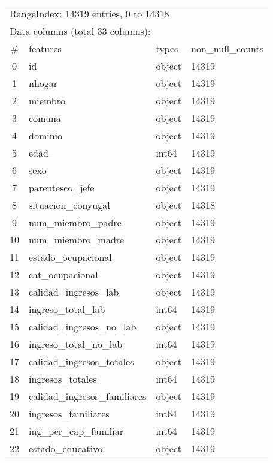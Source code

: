 \documentclass[a4paper]{article}
\begin{document}
    \begin{table}[H]
        \centering
        \begin{tabular}{clll}
            \multicolumn{4}{l}{RangeIndex: 14319 entries, 0 to 14318} \\
            \multicolumn{4}{l}{Data columns (total 33 columns):} \\
            \#  & features & types & non\_null\_counts \\ \hline 
            0   & id & object & 14319 \\ 
            1   & nhogar & object & 14319 \\ 
            2   & miembro & object & 14319 \\ 
            3   & comuna & object & 14319 \\ 
            4   & dominio & object & 14319 \\ 
            5   & edad & int64 & 14319 \\ 
            6   & sexo & object & 14319 \\ 
            7   & parentesco\_jefe & object & 14319 \\ 
            8   & situacion\_conyugal & object & 14318 \\ 
            9   & num\_miembro\_padre & object & 14319 \\ 
            10  & num\_miembro\_madre & object & 14319 \\ 
            11  & estado\_ocupacional & object & 14319 \\ 
            12  & cat\_ocupacional & object & 14319 \\ 
            13  & calidad\_ingresos\_lab & object & 14319 \\ 
            14  & ingreso\_total\_lab & int64 & 14319 \\ 
            15  & calidad\_ingresos\_no\_lab & object & 14319 \\ 
            16  & ingreso\_total\_no\_lab & int64 & 14319 \\ 
            17  & calidad\_ingresos\_totales & object & 14319 \\ 
            18  & ingresos\_totales & int64 & 14319 \\ 
            19  & calidad\_ingresos\_familiares & object & 14319 \\ 
            20  & ingresos\_familiares & int64 & 14319 \\ 
            21  & ing\_per\_cap\_familiar & int64 & 14319 \\ 
            22  & estado\_educativo & object & 14319 \\ 

\end{tabular}
\end{table}
\end{document}
